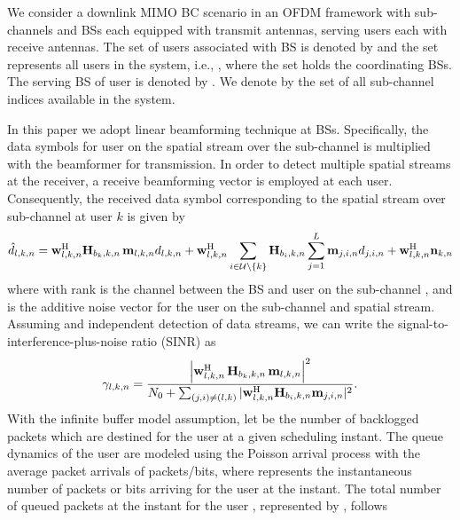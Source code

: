 We consider a downlink \ac{MIMO} \ac{BC} scenario in an \ac{OFDM} framework with  sub-channels and  \acp{BS} each equipped with  transmit antennas, serving  users each with  receive antennas. The set of users associated with \ac{BS}  is denoted by  and the set  represents all users in the system, i.e., , where the set  holds the coordinating \acp{BS}. The serving \ac{BS} of user  is denoted by . We denote by  the set of all sub-channel indices available in the system.

In this paper we adopt linear beamforming technique at \acp{BS}. Specifically, the data symbols  for  user  on the  spatial stream over the sub-channel  is multiplied with the beamformer  for transmission.   In order to detect  multiple spatial streams at the receiver, a receive beamforming vector  is employed at each user. Consequently, the received data symbol corresponding to the  spatial stream over sub-channel  at user $k$ is given by
\begin{equation}\label{eqn-1}
\hat{d}_{l,k,n} = \mvec{w}{l,k,n}^\herm \mvec{H}{b_k,k,n} \,\mvec{m}{l,k,n} d_{l,k,n} + \mvec{w}{l,k,n}^\herm \sum_{i \in \mc{U} \backslash \set{k}} \mvec{H}{b_i,k,n} \sum_{j = 1}^L \mvec{m}{j,i,n}d_{j,i,n} + \mvec{w}{l,k,n}^\herm \mvec{n}{k,n}
\end{equation}
where  with rank  is the channel between the \ac{BS}  and  user  on the sub-channel , and   is the additive noise vector for the user  on the  sub-channel and  spatial stream. Assuming   and independent detection of data streams, we can write the signal-to-interference-plus-noise ratio (SINR) as
\begin{equation}\label{eq:SINR}
\gamma_{l,k,n} = \dfrac{\left |\mvec{w}{l,k,n}^\herm \, \mvec{H}{b_k,k,n} \, \mvec{m}{l,k,n} \right |^2}{N_0 + \sum_{(j,i) \neq (l,k)} |\mvec{w}{l,k,n}^\herm \mvec{H}{b_i,k,n} \mvec{m}{j,i,n} |^2}.
\end{equation}
With the infinite buffer model assumption, let  be the number of backlogged packets which are destined for the user  at a given scheduling instant. The queue dynamics of the user  are modeled using the Poisson arrival process with the average packet arrivals of  packets/bits, where  represents the instantaneous number of packets or bits arriving for the user  at the  instant. The total number of queued packets at the  instant for the user , represented by , follows
